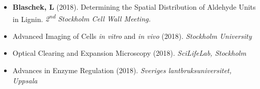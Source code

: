 \documentclass[11pt]{article}
\begin{document}
	\begin{itemize}[label={},itemindent=-9pt,leftmargin=24pt]
	\item \textbf{Blaschek, L} (2018). Determining the Spatial Distribution of Aldehyde Units in Lignin. \textit{2\textsuperscript{nd} Stockholm Cell Wall Meeting.}
	\end{itemize}
\vspace{1cm}

\begin{itemize}[label={},itemindent=-9pt,leftmargin=24pt]
	\item Advanced Imaging of Cells \textit{in vitro} and \textit{in vivo} (2018). \textit{Stockholm University} 
	\item Optical Clearing and Expansion Microscopy (2018). \textit{SciLifeLab, Stockholm} 	
	\item Advances in Enzyme Regulation (2018). \textit{Sveriges lantbruksuniversitet, Uppsala} 
\end{itemize}
\end{document}
